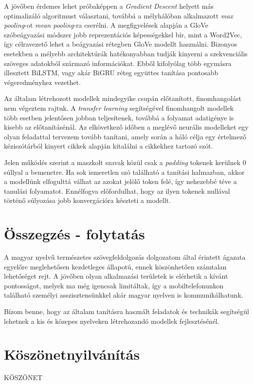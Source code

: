 A jövőben érdemes lehet próbaképpen a \textit{Gradient Descent} helyett más optimalizáló algoritmust választani, továbbá a mélyhálóban alkalmazott \textit{max pooling}-ot \textit{mean pooling}-ra cserélni. A megfigyelések alapján a GloVe szóbeágyazási módszer jobb reprezentációs képességekkel bír, mint a Word2Vec, így célravezető lehet a beágyazási rétegben GloVe modellt használni. Bizonyos esetekben a mélyebb architektúrák hatékonyabban tudják kinyerni a szekvenciális szöveges adatokból származó információkat. Ebből kifolyólag több egymásra illesztett BiLSTM, vagy akár BiGRU réteg együttes tanítása pontosabb végeredményhez vezethet.

Az általam létrehozott modellek mindegyike csupán előtanított, finomhangolást nem végeztem rajtuk. A \textit{transfer learning} segítségével finomhangolt modellek több esetben jelentősen jobban teljesítenek, továbbá a folyamat adatigénye is kisebb az előtanításénál. Az elkövetkező időben a meglévő neurális modelleket egy olyan feladattal tervezem tovább tanítani, amely során a háló célja egy értelmező kéziszótárból kinyert cikkek alapján kitalálni a cikkekhez tartozó szót.

Jelen működés szerint a maszkolt szavak közül csak a \textit{padding} tokenek kerülnek 0 súllyal a bemenetre. Ha sok ismeretlen szó található a tanítási halmazban, akkor a modellünk elfogulttá válhat az azokat jelölő token felé, így nehezebbé téve a tanulási folyamatot. Ennélfogva előfordulhat, hogy az ilyen tokenek nullával történő súlyozása jobb konvergációra készteti a modellt.


\section*{Összegzés - folytatás}

A magyar nyelvű természetes szövegfeldolgozás dolgozatom által érintett ágazata egyelőre meglehetősen kezdetleges állapotú, ennek köszönhetően számtalan lehetőséget rejt. A jövőben olyan alkalmazási területek is elérhetik a kívánt pontosságot, melyek ma még igencsak limitáltak, így a mobiltelefonunkon található személyi asszisztensünkkel akár magyar nyelven is kommunikálhatunk.

Bízom benne, hogy az általam tanításra használt feladatok és technikák segítségül lehetnek a kis és közepes nyelveken létrehozandó modellek fejlesztésénél.



\section{Köszönetnyilvánítás}

KÖSZÖNET